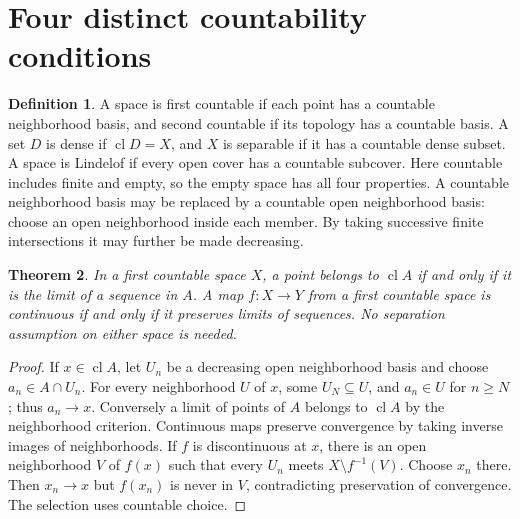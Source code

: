 \documentclass[11pt,oneside,openany]{book}
\newtheorem{theorem}{Theorem}[chapter]
\theoremstyle{definition}
\newtheorem{definition}[theorem]{Definition}
\theoremstyle{remark}
\DeclareMathOperator{\cl}{cl}
\begin{document}
\section{Four distinct countability conditions}
\begin{definition}\label{d10:08:definitions}
A space is first countable if each point has a countable neighborhood basis, and second countable if its topology has a countable basis. A set $D$ is dense if $\cl D=X$, and $X$ is separable if it has a countable dense subset. A space is Lindelof if every open cover has a countable subcover. Here countable includes finite and empty, so the empty space has all four properties. A countable neighborhood basis may be replaced by a countable open neighborhood basis: choose an open neighborhood inside each member. By taking successive finite intersections it may further be made decreasing.
\end{definition}

\begin{theorem}\label{d10:08:first-countable-sequences}
In a first countable space $X$, a point belongs to $\cl A$ if and only if it is the limit of a sequence in $A$. A map $f:X\to Y$ from a first countable space is continuous if and only if it preserves limits of sequences. No separation assumption on either space is needed.
\end{theorem}
\begin{proof}
If $x\in\cl A$, let $U_n$ be a decreasing open neighborhood basis and choose $a_n\in A\cap U_n$. For every neighborhood $U$ of $x$, some $U_N\subseteq U$, and $a_n\in U$ for $n\geq N$; thus $a_n\to x$. Conversely a limit of points of $A$ belongs to $\cl A$ by the neighborhood criterion. Continuous maps preserve convergence by taking inverse images of neighborhoods. If $f$ is discontinuous at $x$, there is an open neighborhood $V$ of $f(x)$ such that every $U_n$ meets $X\setminus f^{-1}(V)$. Choose $x_n$ there. Then $x_n\to x$ but $f(x_n)$ is never in $V$, contradicting preservation of convergence. The selection uses countable choice.
\end{proof}
\end{document}
